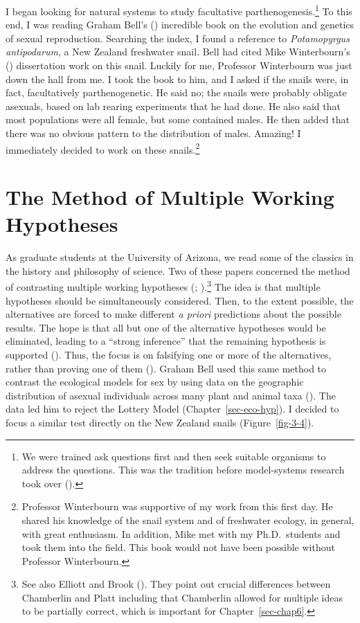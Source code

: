 \documentclass[
  american,
  letterpaper,
]{book}
\begin{document}
I began looking for natural systems to study facultative
parthenogenesis.\footnote{We were trained ask questions first and then
  seek suitable organisms to address the questions. This was the
  tradition before model-systems research took over
  ().} To this end, I was
reading Graham Bell's () incredible book
on the evolution and genetics of sexual reproduction. Searching the
index, I found a reference to \emph{Potamopyrgus antipodarum}, a New
Zealand freshwater snail. Bell had cited Mike Winterbourn's
() dissertation work on this snail.
Luckily for me, Professor Winterbourn was just down the hall from me. I
took the book to him, and I asked if the snails were, in fact,
facultatively parthenogenetic. He said no; the snails were probably
obligate asexuals, based on lab rearing experiments that he had done. He
also said that most populations were all female, but some contained
males. He then added that there was no obvious pattern to the
distribution of males. Amazing! I immediately decided to work on these
snails.\footnote{Professor Winterbourn was supportive of my work from
  this first day. He shared his knowledge of the snail system and of
  freshwater ecology, in general, with great enthusiasm. In addition,
  Mike met with my Ph.D.~students and took them into the field. This
  book would not have been possible without Professor Winterbourn.}

\section{The Method of Multiple Working
Hypotheses}\label{the-method-of-multiple-working-hypotheses}

As graduate students at the University of Arizona, we read some of the
classics in the history and philosophy of science. Two of these papers
concerned the method of contrasting multiple working hypotheses
(;
).\footnote{See also Elliott and
  Brook (). They point out crucial
  differences between Chamberlin and Platt including that Chamberlin
  allowed for multiple ideas to be partially correct, which is important
  for Chapter~\ref{sec-chap6}.} The idea is that multiple hypotheses
should be simultaneously considered. Then, to the extent possible, the
alternatives are forced to make different \emph{a priori} predictions
about the possible results. The hope is that all but one of the
alternative hypotheses would be eliminated, leading to a ``strong
inference'' that the remaining hypothesis is supported
(). Thus, the focus is on
falsifying one or more of the alternatives, rather than proving one of
them (). Graham Bell used this
same method to contrast the ecological models for sex by using data on
the geographic distribution of asexual individuals across many plant and
animal taxa (). The data led him to
reject the Lottery Model (Chapter~\ref{sec-eco-hyp}). I decided to focus
a similar test directly on the New Zealand snails
(Figure~\ref{fig-3-4}).
\end{document}
